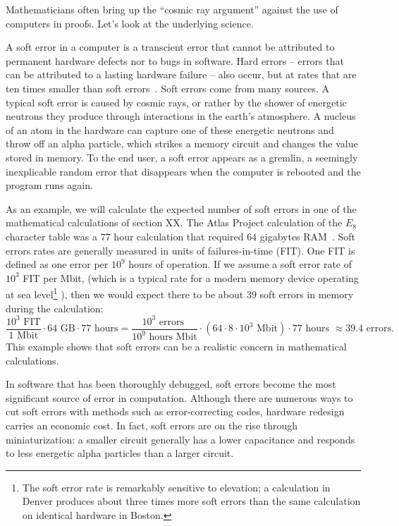 \documentclass{llncs}
\begin{document}
Mathematicians often bring up the ``cosmic ray argument'' against the use
of computers in proofs.  Let's look at the underlying science.

A soft error in a computer is a transcient error that cannot be
attributed to permanent hardware defects nor to bugs in software.  
Hard errors -- errors that can be attributed to a lasting hardware failure --
also occur, but at rates that are ten times smaller than
soft errors~\cite{MW04}.
Soft errors come from many sources. A
typical soft error is caused by cosmic rays, or rather by the shower
of energetic neutrons they produce through interactions in the earth's
atmosphere.  A nucleus of an atom in the hardware can capture one of
these energetic neutrons and throw off an alpha particle, which
strikes a memory circuit and changes the value stored in memory.  To
the end user, a soft error appears as a gremlin, a seemingly
inexplicable random error that disappears when the computer is rebooted and
the program runs again.

As an example, we will calculate the expected
number of soft errors in one of the mathematical calculations of
section XX.  The Atlas Project calculation of
the $E_8$ character table was a $77$ hour calculation that required
$64$ gigabytes RAM~\cite{AtlasSlides}.  Soft errors rates are generally measured in units
of failures-in-time (FIT). One FIT is defined as one error per $10^9$
hours of operation.
If we assume a soft error rate of $10^3$ FIT per Mbit, (which is a
typical rate for a modern memory device operating at sea
level\footnote{The soft error rate is remarkably sensitive to
  elevation; a calculation in Denver produces about three times more
  soft errors than the same calculation on identical hardware in Boston.}
\cite{WP}),
 then we would expect there to be about $39$ soft
errors in memory during the calculation:
\[
\frac{10^3 \text{~FIT}}{1\text{~Mbit}} \cdot 64 \text{~GB} \cdot 77\text{~hours} =
\frac{10^3 \text{~errors~}}{10^9\text{~hours~}\text{Mbit}} \cdot
({64\cdot 8\cdot 10^3 \text{~Mbit}}) \cdot 77\text{~hours~} 
\approx 39.4 \text{~errors}.
\]
This example shows that soft errors can be a realistic concern in
mathematical calculations.

In software that has been thoroughly debugged, soft errors become the
most significant source of error in computation.  Although there are
numerous ways to cut soft errors with methods such as error-correcting
codes, hardware redesign carries an economic cost.  In fact, soft errors are on
the rise through miniaturization: a smaller circuit generally has a lower
capacitance and responds to less energetic alpha particles than a larger
circuit.
\end{document}
